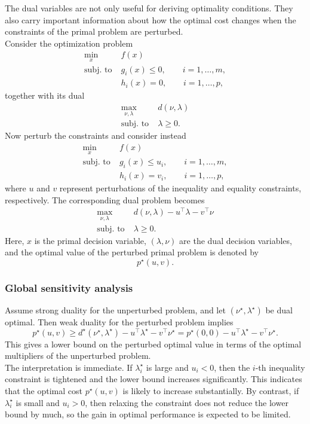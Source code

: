 The dual variables are not only useful for deriving optimality conditions. They also carry
important information about how the optimal cost changes when the constraints of the primal
problem are perturbed.\\
Consider the optimization problem
\[
\begin{aligned}
\min_x \;& f(x)\\
\text{subj. to}\;& g_i(x)\le 0,\qquad i=1,\dots,m,\\
& h_i(x)=0,\qquad i=1,\dots,p,
\end{aligned}
\]
together with its dual
\[
\begin{aligned}
\max_{\nu,\lambda}\;& d(\nu,\lambda)\\
\text{subj. to}\;& \lambda\ge 0.
\end{aligned}
\]
Now perturb the constraints and consider instead
\[
\begin{aligned}
\min_x \;& f(x)\\
\text{subj. to}\;& g_i(x)\le u_i,\qquad i=1,\dots,m,\\
& h_i(x)=v_i,\qquad i=1,\dots,p,
\end{aligned}
\]
where \(u\) and \(v\) represent perturbations of the inequality and equality constraints,
respectively. The corresponding dual problem becomes
\[
\begin{aligned}
\max_{\nu,\lambda}\;& d(\nu,\lambda)-u^\top\lambda-v^\top\nu\\
\text{subj. to}\;& \lambda\ge 0.
\end{aligned}
\]
Here, \(x\) is the primal decision variable, \((\lambda,\nu)\) are the dual decision variables,
and the optimal value of the perturbed primal problem is denoted by
\[
p^\star(u,v).
\]

\subsubsection{Global sensitivity analysis}

Assume strong duality for the unperturbed problem, and let \((\nu^\star,\lambda^\star)\) be dual
optimal. Then weak duality for the perturbed problem implies
\[
p^\star(u,v)
\ge
d^\star(\nu^\star,\lambda^\star)-u^\top\lambda^\star-v^\top\nu^\star
=
p^\star(0,0)-u^\top\lambda^\star-v^\top\nu^\star.
\]
This gives a lower bound on the perturbed optimal value in terms of the optimal multipliers of
the unperturbed problem.\\
The interpretation is immediate. If \(\lambda_i^\star\) is large and \(u_i<0\), then the \(i\)-th
inequality constraint is tightened and the lower bound increases significantly. This indicates
that the optimal cost \(p^\star(u,v)\) is likely to increase substantially. By contrast, if
\(\lambda_i^\star\) is small and \(u_i>0\), then relaxing the constraint does not reduce the lower
bound by much, so the gain in optimal performance is expected to be limited.\\

